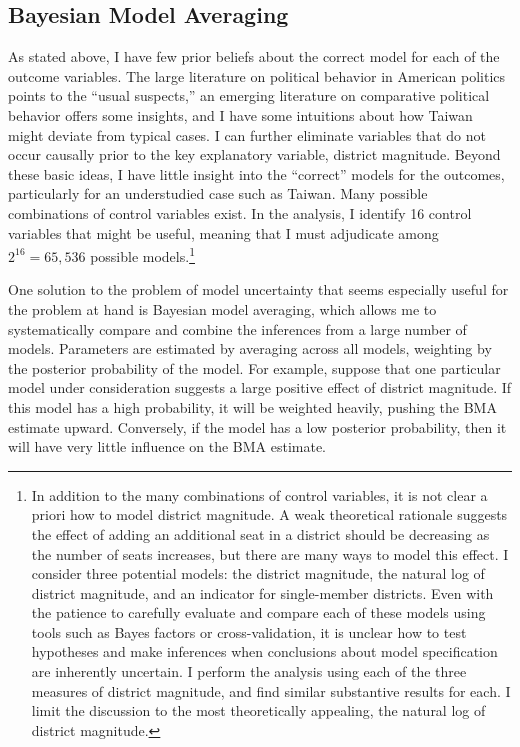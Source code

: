 \documentclass[12pt]{article}
\begin{document}
\subsection*{Bayesian Model Averaging} 

As stated above, I have few prior beliefs about the correct model for each of the outcome variables. The large literature on political behavior in American politics points to the ``usual suspects,'' an emerging literature on comparative political behavior offers some insights, and I have some intuitions about how Taiwan might deviate from typical cases. I can further eliminate variables that do not occur causally prior to the key explanatory variable, district magnitude. Beyond these basic ideas, I have little insight into the ``correct'' models for the outcomes, particularly for an understudied case such as Taiwan. Many possible combinations of control variables exist. In the analysis, I identify 16 control variables that might be useful, meaning that I must adjudicate among $2^{16} = 65,536$ possible models.\footnote{In addition to the many combinations of control variables, it is not clear a priori how to model district magnitude. A weak theoretical rationale suggests the effect of adding an additional seat in a district should be decreasing as the number of seats increases, but there are many ways to model this effect. I consider three potential models: the district magnitude, the natural log of district magnitude, and an indicator for single-member districts. Even with the patience to carefully evaluate and compare each of these models using tools such as Bayes factors or cross-validation, it is unclear how to test hypotheses and make inferences when conclusions about model specification are inherently uncertain. I perform the analysis using each of the three measures of district magnitude, and find similar substantive results for each. I limit the discussion to the most theoretically appealing, the natural log of district magnitude.}

One solution to the problem of model uncertainty that seems especially useful for the problem at hand is Bayesian model averaging, which allows me to systematically compare and combine the inferences from a large number of models. Parameters are estimated by averaging across all models, weighting by the posterior probability of the model. For example, suppose that one particular model under consideration suggests a large positive effect of district magnitude. If this model has a high probability, it will be weighted heavily, pushing the BMA estimate upward. Conversely, if the model has a low posterior probability, then it will have very little influence on the BMA estimate. 
\end{document}
